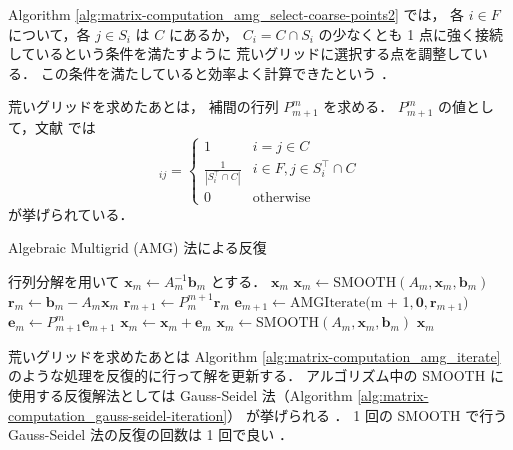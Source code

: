 Algorithm \ref{alg:matrix-computation_amg_select-coarse-points2}
では，
各 $i \in F$ について，各 $j \in S_i$ は $C$ にあるか，
$C_i = C \cap S_i$ の少なくとも 1 点に強く接続しているという条件を満たすように
荒いグリッドに選択する点を調整している．
この条件を満たしていると効率よく計算できたという
\cite{Ruge1987}．

荒いグリッドを求めたあとは，
補間の行列 $P_{m+1}^m$ を求める．
$P_{m+1}^m$ の値として，文献 \cite{Wolters2002} では
\begin{equation}
    [P_{m+1}^m]_{ij} =
    \begin{cases}
        1                                      & i = j \in C                    \\
        \frac{1}{\left|S_i^\top \cap C\right|} & i \in F, j \in S_i^\top \cap C \\
        0                                      & \mathrm{otherwise}
    \end{cases}
\end{equation}
が挙げられている．

\begin{algorithm}[tp]
    \caption{Algebraic Multigrid (AMG) 法による反復 \cite{Wolters2002}}
    \label{alg:matrix-computation_amg_iterate}
    \begin{algorithmic}[1]
        \State 行列分解を用いて $\bm{x}_m \gets A_m^{-1} \bm{b}_m$ とする．
        \State \Return $\bm{x}_m$
        \EndIf
        \State $\bm{x}_m \gets \mathrm{SMOOTH}(A_m, \bm{x}_m, \bm{b}_m)$
        \State $\bm{r}_m \gets \bm{b}_m - A_m \bm{x}_m$
        \State $\bm{r}_{m+1} \gets P_{m}^{m+1} \bm{r}_m$
        \State $\bm{e}_{m+1} \gets \mathrm{AMGIterate}($m + 1$, \bm{0}, \bm{r}_{m+1})$
        \State $\bm{e}_m \gets P_{m+1}^{m} \bm{e}_{m+1}$
        \State $\bm{x}_m \gets \bm{x}_m + \bm{e}_m$
        \State $\bm{x}_m \gets \mathrm{SMOOTH}(A_m, \bm{x}_m, \bm{b}_m)$
        \State \Return $\bm{x}_m$
        \EndProcedure
    \end{algorithmic}
\end{algorithm}

荒いグリッドを求めたあとは
Algorithm \ref{alg:matrix-computation_amg_iterate}
のような処理を反復的に行って解を更新する．
アルゴリズム中の SMOOTH に使用する反復解法としては
Gauss-Seidel 法（Algorithm \ref{alg:matrix-computation_gauss-seidel-iteration}）
が挙げられる
\cite{Ruge1987,Wolters2002}．
1 回の SMOOTH で行う Gauss-Seidel 法の反復の回数は 1 回で良い
\cite{Wolters2002}．

